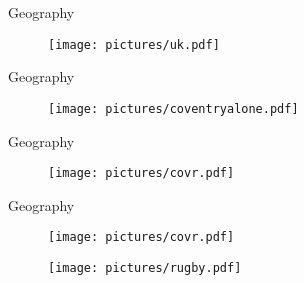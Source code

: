 \documentclass{beamer}
\begin{document}
\begin{frame}{Geography}
  \begin{figure}
  
     \begin{center}
	 \texttt{[image: pictures/uk.pdf]}
	 
  
    \end{center}

    
  \end{figure}

\end{frame}


\begin{frame}{Geography}
  \begin{figure}
  
     \begin{center}
	 \texttt{[image: pictures/coventryalone.pdf]}
	 
  
    \end{center}

    
  \end{figure}

\end{frame}




\begin{frame}{Geography}
  \begin{figure}
  
     \begin{center}
	 \texttt{[image: pictures/covr.pdf]}
	 
  
    \end{center}

    
  \end{figure}

\end{frame}

\begin{frame}{Geography}
  \begin{figure}
  
  \begin{minipage}[b]{0.8\linewidth}
     \begin{center}
	 \texttt{[image: pictures/covr.pdf]}
	 
  
    \end{center}

    
  \end{minipage} 
  \end{figure}
  
  \begin{figure}
  \begin{minipage}[b]{0.5\linewidth}
     \begin{center}
	 \texttt{[image: pictures/rugby.pdf]}
  
    \end{center}

    
  \end{minipage}
   \end{figure}

  \end{frame}
 
\end{document}
